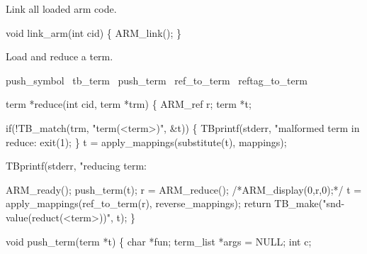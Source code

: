 
Link all loaded arm code.

\nwenddocs{}\endmoddef\let\nwnotused=\nwoutput{}
void link_arm(int cid)
\{
  ARM_link();
\}
\nwendcode{}\nwdocspar


Load and reduce a term.

\nwenddocs{}\endmoddef\let\nwnotused=\nwoutput{}
\LA{}push_symbol~{\nwtagstyle{}}\RA{}
\LA{}tb_term~{\nwtagstyle{}}\RA{}
\LA{}push_term~{\nwtagstyle{}}\RA{}
\LA{}ref_to_term~{\nwtagstyle{}}\RA{}
\LA{}reftag_to_term~{\nwtagstyle{}}\RA{}
\nwendcode{}\nwdocspar


\nwenddocs{}\plusendmoddef\let\nwnotused=\nwoutput{}
term *reduce(int cid, term *trm)
\{
  ARM_ref r;
  term *t;

  if(!TB_match(trm, "term(<term>)", &t)) \{
    TBprintf(stderr, "malformed term in reduce: %
    exit(1);
  \}
  t = apply_mappings(substitute(t), mappings);

  TBprintf(stderr, "reducing term: %

  ARM_ready();
  push_term(t);
  r = ARM_reduce();
  /*ARM_display(0,r,0);*/
  t = apply_mappings(ref_to_term(r), reverse_mappings);
  return TB_make("snd-value(reduct(<term>))", t);
\}
\nwendcode{}\nwdocspar


\nwenddocs{}\endmoddef\let\nwnotused=\nwoutput{}
void push_term(term *t)
\{
  char *fun;
  term_list *args = NULL;
  int c;

